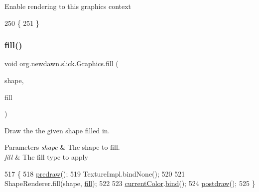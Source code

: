 Enable rendering to this graphics context 
\begin{DoxyCode}
250                             \{
251     \}
\end{DoxyCode}
\mbox{\label{classorg_1_1newdawn_1_1slick_1_1_graphics_a7c694d58339cd5e41270cb46aa52929c}} 
\subsubsection{\texorpdfstring{fill()}{fill()}\hspace{0.1cm}{\footnotesize\ttfamily [1/2]}}
{\footnotesize\ttfamily void org.\+newdawn.\+slick.\+Graphics.\+fill (\begin{DoxyParamCaption}\item[{\mbox{\hyperlink{classorg_1_1newdawn_1_1slick_1_1geom_1_1_shape}{Shape}}}]{shape,  }\item[{\mbox{\hyperlink{interfaceorg_1_1newdawn_1_1slick_1_1_shape_fill}{Shape\+Fill}}}]{fill }\end{DoxyParamCaption})\hspace{0.3cm}{\ttfamily [inline]}}

Draw the the given shape filled in.


\begin{DoxyParams}{Parameters}
{\em shape} & The shape to fill. \\
\hline
{\em fill} & The fill type to apply \\
\hline
\end{DoxyParams}

\begin{DoxyCode}
517                                                   \{
518         \mbox{\hyperlink{classorg_1_1newdawn_1_1slick_1_1_graphics_a7b4c203181e3b6302d51ed9b24596b8d}{predraw}}();
519         TextureImpl.bindNone();
520 
521         ShapeRenderer.fill(shape, \mbox{\hyperlink{classorg_1_1newdawn_1_1slick_1_1_graphics_a7c694d58339cd5e41270cb46aa52929c}{fill}});
522 
523         \mbox{\hyperlink{classorg_1_1newdawn_1_1slick_1_1_graphics_add4b542e574390a735aad66468135d5a}{currentColor}}.\mbox{\hyperlink{classorg_1_1newdawn_1_1slick_1_1_color_ae4b71c94854f7983f2ccdb7340438e23}{bind}}();
524         \mbox{\hyperlink{classorg_1_1newdawn_1_1slick_1_1_graphics_abe054371d1486618ff327bbbcf02ff97}{postdraw}}();
525     \}
\end{DoxyCode}
\mbox{\label{classorg_1_1newdawn_1_1slick_1_1_graphics_a878d7180ec903dab22016badb27a202a}} 
